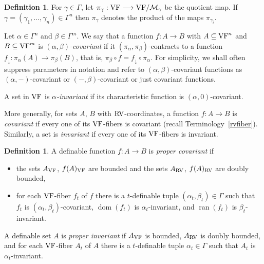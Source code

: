 \documentclass[12pt]{amsart}
\newcommand{\memph}[1]{{\color{magenta}\emph{#1}}}
\theoremstyle{plain}
\theoremstyle{definition}
\newtheorem{defn}[thm]{Definition}
\theoremstyle{remark}
\numberwithin{equation}{section}
\theoremstyle{plain}
\newcommand{\VF}{\textup{VF}}
\newcommand{\RV}{\textup{RV}}
\newcommand{\MM}{\mdl M}
\DeclareMathOperator{\ran}{ran}
\DeclareMathOperator{\dom}{dom}
\newcommand{\0}{\emptyset}
\newcommand{\mdl}[1]{\mathcal{#1}}  %
\newcommand{\fun}{\longrightarrow}
\newcommand{\sub}{\subseteq}
\begin{document}
\begin{defn}\label{defn:binv}
For $\gamma \in \Gamma$, let $\pi_\gamma: \VF \fun \VF / \MM_{\gamma}$ be the quotient  map. If $\gamma = (\gamma_1, \ldots, \gamma_n) \in \Gamma^n$ then $\pi_{\gamma}$ denotes the product of the maps $\pi_{\gamma_i}$.

Let $\alpha \in \Gamma^n$ and $\beta \in \Gamma^m$. We say that a function $f :A \fun B$ with $A \sub \VF^n$ and $B \sub \VF^m$  is \memph{$(\alpha, \beta)$-covariant} if it $(\pi_{\alpha}, \pi_{\beta})$-contracts to a function $f_\downarrow : \pi_{\alpha}(A) \fun \pi_{\beta}(B)$, that is, $\pi_{\beta} \circ f = f_\downarrow \circ \pi_{\alpha}$. For simplicity, we shall often suppress parameters in notation and refer to $(\alpha, \beta)$-covariant functions as $(\alpha, -)$-covariant or $(-,\beta)$-covariant or just  covariant functions.

A set  in $\VF$ is \memph{$\alpha$-invariant} if its characteristic function is $(\alpha, 0)$-covariant.


More generally, for sets $A$, $B$ with $\RV$-coordinates, a function $f : A \fun B$ is \memph{covariant} if every one of its $\VF$-fibers    is covariant (recall Terminology~\ref{rvfiber}). Similarly, a set is \memph{invariant} if every one of its $\VF$-fibers is invariant.
\end{defn}


\begin{defn}\label{prop:pseu}
A definable function $f : A \fun B$ is \memph{proper covariant} if
\begin{itemize}
  \item the sets $A_{\VF}$, $f(A)_{\VF}$ are bounded and the sets $A_{\RV}$, $f(A)_{\RV}$ are  doubly bounded,
  \item for each $\VF$-fiber $f_{t}$ of $f$ there is a $t$-definable tuple $(\alpha_t, \beta_t) \in \Gamma$ such that $f_t$ is $(\alpha_{t}, \beta_{t})$-covariant, $\dom(f_{t})$ is $\alpha_t$-invariant, and $\ran(f_{t})$ is $\beta_t$-invariant.
\end{itemize}
A definable set $A$ is \memph{proper invariant}   if $A_{\VF}$ is bounded, $A_{\RV}$ is doubly bounded, and for each $\VF$-fiber $A_t$ of $A$ there is a $t$-definable tuple $\alpha_t\in \Gamma$ such that $A_t$ is $\alpha_t$-invariant.
\end{defn}
\end{document}
